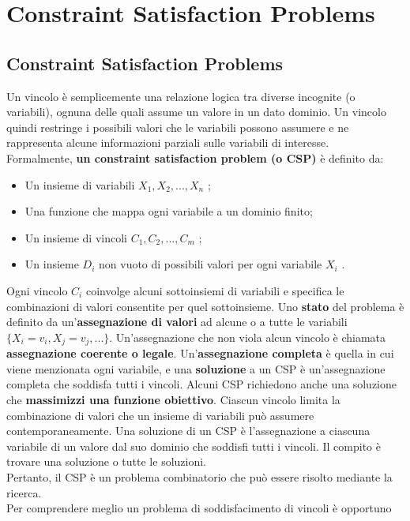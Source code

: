 \chapter{Constraint Satisfaction Problems} \label{ch:Costraint Satisfaction
    Problems}
\section{Constraint Satisfaction Problems}
Un vincolo è semplicemente una relazione logica tra diverse incognite (o
variabili), ognuna delle quali assume un valore in un dato dominio. Un vincolo
quindi restringe i possibili valori che le variabili possono assumere e ne
rappresenta alcune informazioni parziali sulle variabili di interesse.
\\Formalmente, \textbf{un constraint satisfaction problem (o CSP)} è definito da:
\begin{itemize}
    \item Un insieme di variabili $X_1, X_2, ... , X_n$ ;
    \item Una funzione che mappa ogni variabile a un dominio finito;
    \item Un insieme di vincoli $C_1, C_2, ... , C_m$ ;
    \item Un insieme $D_i$ non vuoto di possibili valori per ogni variabile
          $X_i$ .
\end{itemize}
Ogni vincolo $C_i$ coinvolge alcuni sottoinsiemi di variabili e specifica le
combinazioni di valori consentite per quel sottoinsieme. Uno \textbf{stato} del
problema è definito da un'\textbf{assegnazione di valori }ad alcune o a tutte le
variabili $\{X_i = v_i , X_j = v_j, ... \}.$ Un'assegnazione che non viola alcun
vincolo è chiamata \textbf{assegnazione coerente o legale}.
Un'\textbf{assegnazione completa} è quella in cui viene menzionata ogni
variabile, e una \textbf{soluzione} a un CSP è un'assegnazione completa che
soddisfa tutti i vincoli. Alcuni CSP richiedono anche una soluzione che
\textbf{massimizzi una funzione obiettivo}. Ciascun vincolo limita la
combinazione di valori che un insieme di variabili può assumere
contemporaneamente. Una soluzione di un CSP è l'assegnazione a ciascuna
variabile di un valore dal suo dominio che soddisfi tutti i vincoli. Il compito
è trovare una soluzione o tutte le soluzioni. \\
Pertanto, il CSP è un problema combinatorio che può essere risolto mediante la
ricerca. \\
Per comprendere meglio un problema di soddisfacimento di vincoli è opportuno
